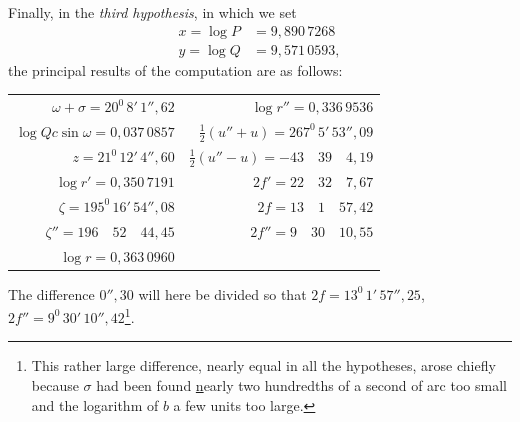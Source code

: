 Finally, in the \textit{third hypothesis}, in which we set
\[
\begin{aligned}
x=\log P&=9{,}890\,7268\\
y=\log Q&=9{,}571\,0593,
\end{aligned}
\]
\noindent the principal results of the computation are as follows:
\begin{center}\begingroup\footnotesize\setlength{\tabcolsep}{6pt}\renewcommand{\arraystretch}{1.3}
\begin{tabular}{r|r}
$\omega+\sigma=20^0\,8'\,1''{,}62$ & $\log r''=0{,}336\,9536$\\
$\log Qc\sin\omega=0{,}037\,0857$ & $\tfrac12(u''+u)=267^0\,5'\,53''{,}09$\\
$z=21^0\,12'\,4''{,}60$ & $\tfrac12(u''-u)=-43\quad39\quad4{,}19$\\
$\log r'=0{,}350\,7191$ & $2f'=22\quad32\quad7{,}67$\\
$\zeta=195^0\,16'\,54''{,}08$ & $2f=13\quad1\quad57{,}42$\\
$\zeta''=196\quad52\quad44{,}45$ & $2f''=9\quad30\quad10{,}55$\\
$\log r=0{,}363\,0960$ &
\end{tabular}\endgroup\end{center}
\noindent{}The difference $0''{,}30$ will here be divided so that $2f=13^0\,1'\,57''{,}25$, $2f''=9^0\,30'\,10''{,}42$\footnote{This rather large difference, nearly equal in all the hypotheses, arose chiefly because $\sigma$ had been found \underline{n}early two hundredths of a second of arc too small and the logarithm of $b$ a few units too large.}.

